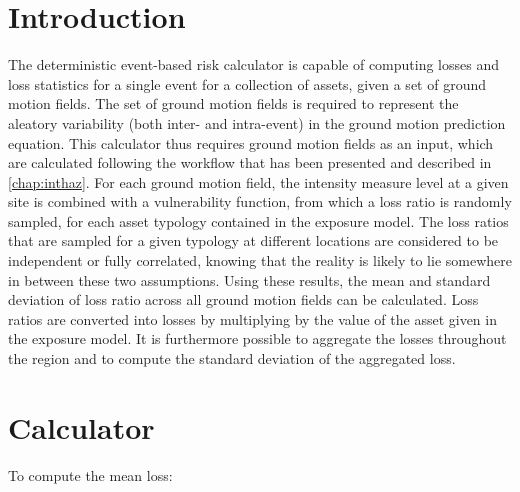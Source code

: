 

\section{Introduction}
The deterministic event-based risk calculator is capable of computing losses and loss statistics for a single event for a collection of assets, given a set of ground motion fields. The set of ground motion fields is required to represent the aleatory variability (both inter- and intra-event) in the ground motion prediction equation. This calculator thus requires ground motion fields as an input, which are calculated following the workflow that has been presented and described in \ref{chap:inthaz}. For each ground motion field, the intensity measure level at a given site is combined with a vulnerability function, from which a loss ratio is randomly sampled, for each asset typology contained in the exposure model. The loss ratios that are sampled for a given typology at different locations are considered to be independent or fully correlated, knowing that the reality is likely to lie somewhere in between these two assumptions. Using these results, the mean and standard deviation of loss ratio across all ground motion fields can be calculated. Loss ratios are converted into losses by multiplying by the value of the asset given in the exposure model. It is furthermore possible to aggregate the losses throughout the region and to compute the standard deviation of the aggregated loss. 

\section{Calculator}

To compute the mean loss:

